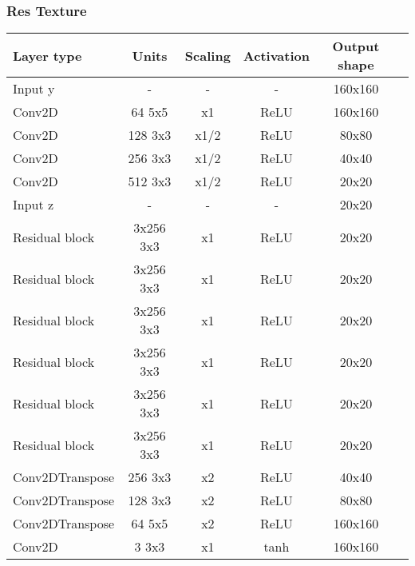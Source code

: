 \begin{table*}[!h]
\subsubsection{Res Texture}
{
	\centering
	\begin{tabular}{|l|c|c|c|c|c|}
		\hline
		Layer type & Units & Scaling & Activation & Output shape\\
		\hline
		Input y & - & - & - & 160x160\\
		Conv2D & 64 5x5 & x1 & ReLU & 160x160 \\
		Conv2D & 128 3x3 & x1/2 & ReLU & 80x80 \\
		Conv2D & 256 3x3 & x1/2 & ReLU & 40x40 \\
		Conv2D & 512 3x3 & x1/2 & ReLU & 20x20 \\
		Input z & - & - & - & 20x20 \\
		Residual block & 3x256 3x3 & x1 & ReLU & 20x20 \\
		Residual block & 3x256 3x3 & x1 & ReLU & 20x20 \\
		Residual block & 3x256 3x3 & x1 & ReLU & 20x20 \\
		Residual block & 3x256 3x3 & x1 & ReLU & 20x20 \\
		Residual block & 3x256 3x3 & x1 & ReLU & 20x20 \\
		Residual block & 3x256 3x3 & x1 & ReLU & 20x20 \\
		Conv2DTranspose & 256 3x3 & x2 & ReLU & 40x40 \\
		Conv2DTranspose & 128 3x3 & x2 & ReLU & 80x80 \\
		Conv2DTranspose & 64 5x5 & x2 & ReLU & 160x160 \\
		Conv2D & 3 3x3 & x1 & tanh & 160x160 \\
		\hline
	\end{tabular}
} 


\end{table*}
